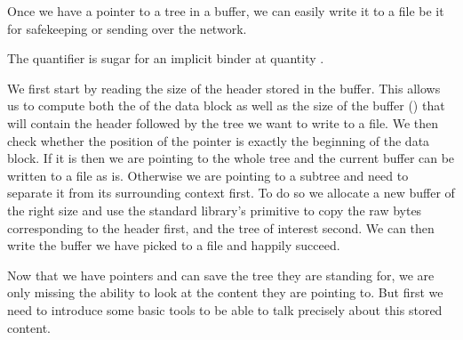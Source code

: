 Once we have a pointer to a tree in a buffer, we can easily write it to a
file be it for safekeeping or sending over the network.


\begin{remark}
  The  quantifier is sugar for an implicit
  binder at quantity .
\end{remark}


We first start by reading the size of the header stored in the buffer.
%
This allows us to compute both the  of the data block
as well as the size of the buffer () that will
contain the header followed by the tree we want to write to a file.
%
We then check whether the position of the pointer is exactly the beginning
of the data block.
%
If it is then we are pointing to the whole tree and the current buffer can
be written to a file as is.
%
Otherwise we are pointing to a subtree and need to separate it from its
surrounding context first.
%
To do so we allocate a new buffer of the right size and use the
standard library's  primitive to copy the raw bytes
corresponding to the header first, and the tree of interest second.
%
We can then write the buffer we have picked to a file and happily succeed.



Now that we have pointers and can save the tree they are standing for,
we are only missing the ability to look at the content they are pointing to.
%
But first we need to introduce some basic tools
to be able to talk precisely about this stored content.
